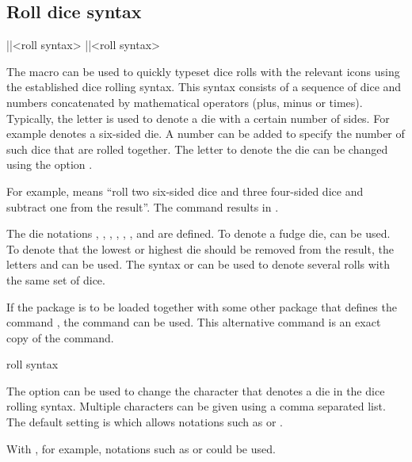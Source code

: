 \documentclass[a4paper]{article}
\begin{document}
\subsection{Roll dice syntax}\label{sec:roll-dice-syntax}

\begin{macrodef}
|\roll|{<roll syntax>}
|\RPGIconsRoll|{<roll syntax>}
\end{macrodef}
The \macro{\roll} macro can be used to quickly typeset dice rolls with the relevant icons using the established dice rolling syntax. This syntax consists of a sequence of dice and numbers concatenated by mathematical operators (plus, minus or times). Typically, the letter  is used to denote a die with a certain number of sides. For example  denotes a six-sided die. A number can be added to specify the number of such dice that are rolled together. The letter to denote the die can be changed using the option .

For example,  means ``roll two six-sided dice and three four-sided dice and subtract one from the result''. The command  results in .

The die notations , , , , , ,  and  are defined. To denote a fudge die,  can be used. To denote that the lowest or highest die should be removed from the result, the letters  and  can be used. The syntax  or  can be used to denote several rolls with the same set of dice.

If the  package is to be loaded together with some other package that defines the command \macro{\roll}, the command \macro{\RPGIconsRoll} can be used. This alternative command is an exact copy of the \macro{\roll} command.

\begin{macrodef}
roll syntax
\end{macrodef}
The option  can be used to change the character that denotes a die in the dice rolling syntax. Multiple characters can be given using a comma separated list. The default setting is  which allows notations such as  or .

With , for example, notations such as  or  could be used.

\end{document}
